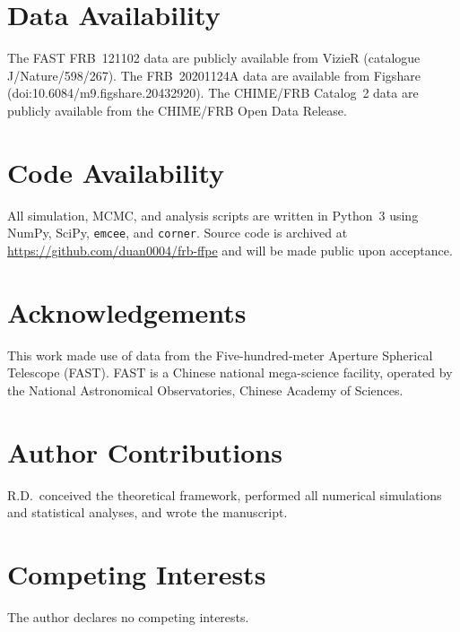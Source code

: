\documentclass[twocolumn]{article}
\begin{document}
\section*{Data Availability}
The FAST FRB~121102 data are publicly available from VizieR (catalogue J/Nature/598/267). The FRB~20201124A data are available from Figshare (doi:10.6084/m9.figshare.20432920). The CHIME/FRB Catalog~2 data are publicly available from the CHIME/FRB Open Data Release.

\section*{Code Availability}
All simulation, MCMC, and analysis scripts are written in Python~3 using NumPy, SciPy, \texttt{emcee}\cite{foremanmackey2013}, and \texttt{corner}\cite{corner2016}. Source code is archived at \url{https://github.com/duan0004/frb-ffpe} and will be made public upon acceptance.

\section*{Acknowledgements}
This work made use of data from the Five-hundred-meter Aperture Spherical Telescope (FAST). FAST is a Chinese national mega-science facility, operated by the National Astronomical Observatories, Chinese Academy of Sciences.

\section*{Author Contributions}
R.D.\ conceived the theoretical framework, performed all numerical simulations and statistical analyses, and wrote the manuscript.

\section*{Competing Interests}
The author declares no competing interests.
\end{document}
